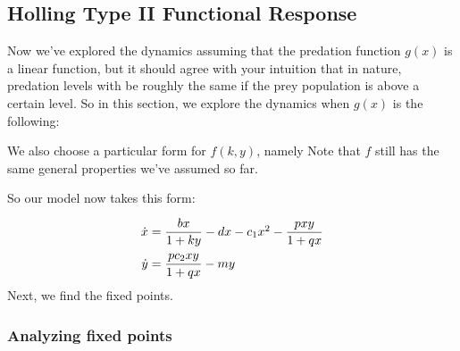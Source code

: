 \documentclass[a5paper]{article}
\theoremstyle{definition}%
\numberwithin{exercise}{section}
\theoremstyle{remark}%
\begin{document}
\subsection{Holling Type II Functional Response}
Now we've explored the dynamics assuming that the predation function $g(x)$ is a linear function, but it should agree with your intuition that in nature, predation levels with be roughly the same if the prey population is above a certain level. So in this section, we explore the dynamics when $g(x)$ is the following:


We also choose a particular form for $f(k,y)$, namely 
Note that $f$ still has the same general properties we've assumed so far. 


So our model now takes this form:
\[\arraycolsep=1.4pt\def\arraystretch{2}
\begin{array}{rcl}
\dot{x}&=&\dfrac{bx}{1+ky}-dx-c_1x^2-\dfrac{pxy}{1+qx}\\
\dot{y}&=&\dfrac{pc_2xy}{1+qx}-my
\end{array}\]
Next, we find the fixed points. 

\subsubsection*{Analyzing fixed points}
\end{document}

